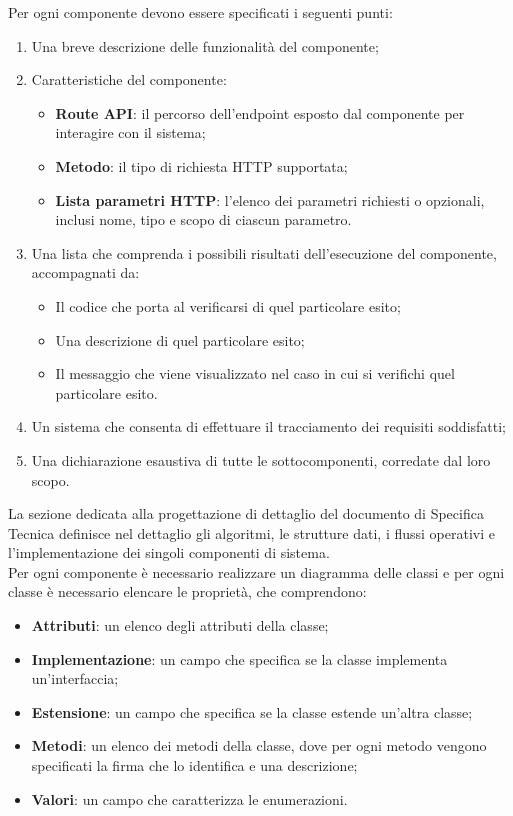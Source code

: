 Per ogni componente devono essere specificati i seguenti punti:
\begin{enumerate}
    \item Una breve descrizione delle funzionalità del componente;
    \item Caratteristiche del componente:
    \begin{itemize}
        \item \textbf{Route API}: il percorso dell’endpoint esposto dal componente per interagire con il sistema;
        \item \textbf{Metodo}: il tipo di richiesta HTTP supportata;
        \item \textbf{Lista parametri HTTP}: l'elenco dei parametri richiesti o opzionali, inclusi nome, tipo e scopo di ciascun parametro.
    \end{itemize}
    \item Una lista che comprenda i possibili risultati dell'esecuzione del componente, accompagnati da:
    \begin{itemize}
        \item Il codice che porta al verificarsi di quel particolare esito;
        \item Una descrizione di quel particolare esito;
        \item Il messaggio che viene visualizzato nel caso in cui si verifichi quel particolare esito.
    \end{itemize}
    \item Un sistema che consenta di effettuare il tracciamento dei requisiti soddisfatti;
    \item Una dichiarazione esaustiva di tutte le sottocomponenti, corredate dal loro scopo.
\end{enumerate}

La sezione dedicata alla progettazione di dettaglio del documento di Specifica Tecnica definisce nel dettaglio gli algoritmi, le strutture dati, i flussi operativi e l'implementazione dei singoli componenti di sistema.\\
Per ogni componente è necessario realizzare un diagramma delle classi e per ogni classe è necessario elencare le proprietà, che comprendono:
\begin{itemize}
    \item \textbf{Attributi}: un elenco degli attributi della classe;
    \item \textbf{Implementazione}: un campo che specifica se la classe implementa un'interfaccia;
    \item \textbf{Estensione}: un campo che specifica se la classe estende un'altra classe;
    \item \textbf{Metodi}: un elenco dei metodi della classe, dove per ogni metodo vengono specificati la firma che lo identifica e una descrizione;
    \item \textbf{Valori}: un campo che caratterizza le enumerazioni.
\end{itemize}

